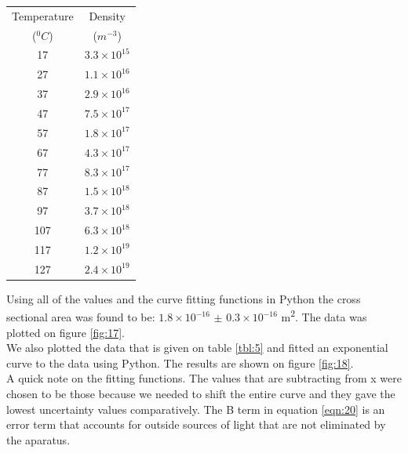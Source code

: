 \documentclass[twocolumn]{article}
\begin{document}
\begin{minipage}{\linewidth}
\begin{tabular}{|c|c|}
\hline
Temperature & Density \\ 
($^0C$) & ($m^{-3}$) \\ \hline
17 & $3.3\times10^{15}$ \\ \hline
27 & $1.1\times10^{16}$ \\ \hline
37 & $2.9\times10^{16}$ \\ \hline
47 & $7.5\times10^{17}$ \\ \hline
57 & $1.8\times10^{17}$ \\ \hline
67 & $4.3\times10^{17}$ \\ \hline
77 & $8.3\times10^{17}$ \\ \hline
87 & $1.5\times10^{18}$ \\ \hline
97 & $3.7\times10^{18}$ \\ \hline
107 & $6.3\times10^{18}$ \\ \hline
117 & $1.2\times10^{19}$ \\ \hline
127 & $2.4\times10^{19}$ \\ \hline
\end{tabular}
\label{tbl:5}
\end{minipage}
Using all of the values and the curve fitting functions in Python the cross 
sectional area was found to be: $1.8\times10^{-16}$ $\pm$ $0.3\times10^{-16}$ 
m\textsuperscript{2}. The data was plotted on figure \ref{fig:17}.
\\
We also plotted the data that is given on table \ref{tbl:5} and fitted an 
exponential curve to the data using Python. The results are shown on figure 
\ref{fig:18}.
\\
A quick note on the fitting functions. The values that are subtracting from x 
were chosen to be those because we needed to shift the entire curve and they 
gave the lowest uncertainty values comparatively. The B term in equation 
\ref{eqn:20} is an error term that accounts for outside sources of light that 
are not eliminated by the aparatus.
\end{document}

